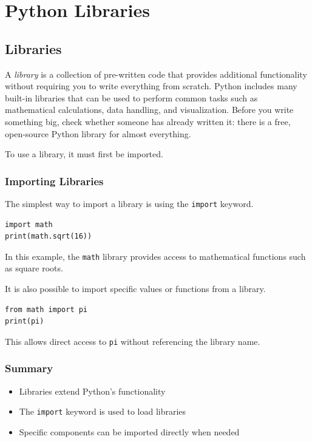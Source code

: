 \chapter{Python Libraries}

\section{Libraries}
A \emph{library} is a collection of pre-written code that provides additional
functionality without requiring you to write everything from scratch. Python
includes many built-in libraries that can be used to perform common tasks such as
mathematical calculations, data handling, and visualization. Before you write something big, check whether someone has already written it: there is a free, open-source Python library for almost everything.

To use a library, it must first be imported.

\subsection{Importing Libraries}

The simplest way to import a library is using the \texttt{import} keyword.

\begin{verbatim}
import math
print(math.sqrt(16))
\end{verbatim}

In this example, the \texttt{math} library provides access to mathematical
functions such as square roots.

It is also possible to import specific values or functions from a library.

\begin{verbatim}
from math import pi
print(pi)
\end{verbatim}

This allows direct access to \texttt{pi} without referencing the library name.

\subsection{Summary}

\begin{itemize}
    \item Libraries extend Python's functionality
    \item The \texttt{import} keyword is used to load libraries
    \item Specific components can be imported directly when needed
\end{itemize}

